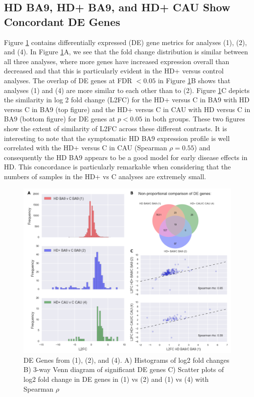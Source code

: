 \documentclass[fleqn,10pt,table]{wlscirep}
\begin{document}
\subsection{HD BA9, HD+ BA9, and HD+ CAU Show Concordant DE Genes}

Figure \ref{fig:de_genes} contains differentially expressed (DE) gene metrics for analyses (1), (2), and (4).
In Figure \ref{fig:de_genes}A, we see that the fold change distribution is similar between all three analyses, where more genes have increased expression overall than decreased and that this is particularly evident in the HD+ versus control analyses.
The overlap of DE genes at FDR $< 0.05$ in Figure \ref{fig:de_genes}B shows that analyses (1) and (4) are more similar to each other than to (2).
Figure \ref{fig:de_genes}C depicts the similarity in log 2 fold change (L2FC) for the HD+ versus C in BA9 with HD versus C in BA9 (top figure) and the HD+ versus C in CAU with HD versus C in BA9 (bottom figure) for DE genes at $p<0.05$ in both groups.
These two figures show the extent of similarity of L2FC across these different contrasts.
It is interesting to note that the symptomatic HD BA9 expression profile is well correlated with the HD+ versus C in CAU (Spearman $\rho=0.55$) and consequently the HD BA9 appears to be a good model for early disease effects in HD.
This concordance is particularly remarkable when considering that the numbers of samples in the HD+ vs C analyses are extremely small.


\begin{figure}[ht]
\centering
\includegraphics[width=0.65\linewidth]{Histo_venn.png}
\caption{DE Genes from (1), (2), and (4). A) Histograms of log2 fold changes B) 3-way Venn diagram of significant DE genes C) Scatter plots of log2 fold change in DE genes in (1) vs (2) and (1) vs (4) with Spearman $\rho$ \label{fig:de_genes}}
\end{figure}
\end{document}
